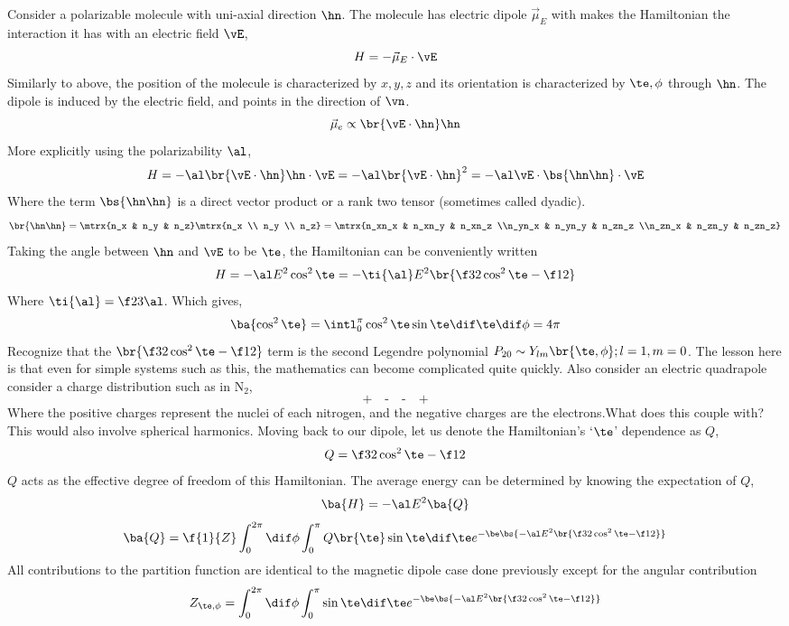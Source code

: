 \documentclass{article}
\begin{document}
Consider a polarizable molecule with uni-axial direction $\hn$. The molecule has electric dipole $\vec{\mu}_E$ with makes the Hamiltonian the interaction it has with an electric field $\vE$,
\[ H = - \vec{\mu}_E \cdot \vE \]
Similarly to above, the position of the molecule is characterized by $x,y,z$ and its orientation is characterized by $\te,\phi$ through $\hn$. The dipole is induced by the electric field, and points in the direction of $\vn$.
\[ \vec{\mu}_e \propto \br{\vE \cdot \hn} \hn \]
 More explicitly using the polarizability $\al$,
\[ H = - \al \br{\vE \cdot \hn} \hn \cdot \vE = - \al \br{\vE \cdot \hn}^2 = -\al \vE \cdot \bs{\hn \hn} \cdot \vE \]
Where the term $\bs{\hn\hn}$ is a direct vector product or a rank two tensor (sometimes called dyadic).
\[ \br{\hn\hn} = \mtrx{n_x & n_y & n_z}\mtrx{n_x \\ n_y \\ n_z} = \mtrx{n_xn_x & n_xn_y & n_xn_z \\n_yn_x & n_yn_y & n_zn_z \\n_zn_x & n_zn_y & n_zn_z} \]
Taking the angle between $\hn$ and $\vE$ to be $\te$, the Hamiltonian can be conveniently written
\[ H = - \al E^2 \cos^2 \te = - \ti{\al} E^2 \br{\f32\cos^2 \te - \f12} \]
Where $\ti{\al} = \f23 \al$. Which gives,
\[ \ba{\cos^2 \te} = \intl_{0}^{\pi} \cos^2 \te \sin \te \dif \te \dif \phi = 4\pi \]
Recognize that the $\br{\f32 \cos^2 \te - \f12}$ term is the second Legendre polynomial $P_{20} \sim Y_{lm}\br{\te, \phi}; l=1,m=0$.
The lesson here is that even for simple systems such as this, the mathematics can become complicated quite quickly. Also consider an electric quadrapole consider a charge distribution such as in $\text{N}_2$,
\[  \textbf{+} \quad \textbf{-} \quad \textbf{-} \quad \textbf{+} \]
Where the positive charges represent the nuclei of each nitrogen, and the negative charges are the electrons.What does this couple with? This would also involve spherical harmonics. Moving back to our dipole, let us denote the Hamiltonian's `$\te$' dependence as $Q$,
\[ Q = \f32 \cos^2 \te - \f12 \]
$Q$ acts as the effective degree of freedom of this Hamiltonian. The average energy can be determined by knowing the expectation of $Q$,
\[ \ba{H} = - \al E^2 \ba{Q} \]
\[ \ba{Q} = \f{1}{Z}\int_{0}^{2\pi} \dif \phi \int_{0}^{\pi} Q\br{\te}\sin \te \dif \te e^{-\be \bs{-\al E^2 \br{\f32 \cos^2\te - \f12}}} \]
All contributions to the partition function are identical to the magnetic dipole case done previously except for the angular contribution
\[ Z_{\te,\phi} = \int_{0}^{2\pi} \dif \phi \int_{0}^{\pi} \sin \te \dif \te e^{-\be \bs{-\al E^2 \br{\f32 \cos^2\te - \f12}}} \]
\end{document}
